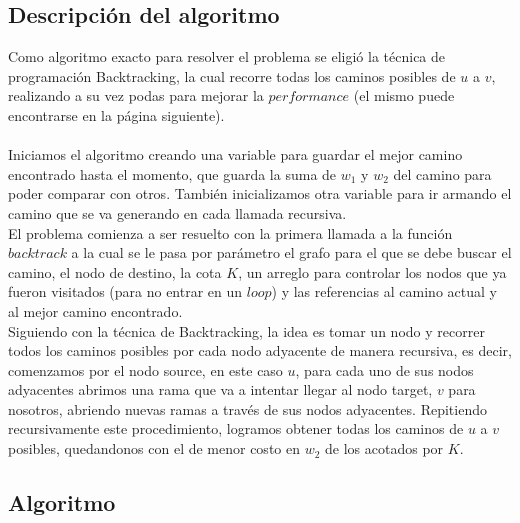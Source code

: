 \subsection{Descripci\'on del algoritmo}

Como algoritmo exacto para resolver el problema se eligi\'o la t\'ecnica de programaci\'on Backtracking, la cual recorre todas los caminos posibles de $u$ a $v$, realizando a su vez podas para mejorar la $performance$ (el mismo puede encontrarse en la p\'agina siguiente).\\\\

Iniciamos el algoritmo creando una variable para guardar el mejor camino encontrado hasta el momento, que guarda la suma de $w_{1}$ y $w_{2}$ del camino para poder comparar con otros. Tambi\'en inicializamos otra variable para ir armando el camino que se va generando en cada llamada recursiva.\\

El problema comienza a ser resuelto con la primera llamada a la funci\'on $backtrack$ a la cual se le pasa por par\'ametro el grafo para el que se debe buscar el camino, el nodo de destino, la cota $K$, un arreglo para controlar los nodos que ya fueron visitados (para no entrar en un $loop$) y las referencias al camino actual y al mejor camino encontrado.
\\

Siguiendo con la t\'ecnica de Backtracking, la idea es tomar un nodo y recorrer todos los caminos posibles por cada nodo adyacente de manera recursiva, es decir, comenzamos por el nodo source, en este caso $u$, para cada uno de sus nodos adyacentes abrimos una rama que va a intentar llegar al nodo target, $v$ para nosotros, abriendo nuevas ramas a trav\'es de sus nodos adyacentes. Repitiendo recursivamente este procedimiento, logramos obtener todas los caminos de $u$ a $v$ posibles, quedandonos con el de menor costo en $w_{2}$ de los acotados por $K$.

\newpage
\subsection{Algoritmo}

